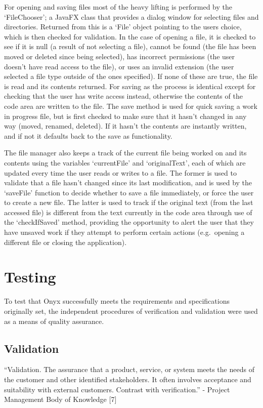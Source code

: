 \documentclass[
]{report}
\begin{document}
For opening and saving files most of the heavy lifting is performed by
the `FileChooser'; a JavaFX class that provides a dialog window for
selecting files and directories. Returned from this is a `File' object
pointing to the users choice, which is then checked for validation. In
the case of opening a file, it is checked to see if it is null (a result
of not selecting a file), cannot be found (the file has been moved or
deleted since being selected), has incorrect permissions (the user
doesn't have read access to the file), or uses an invalid extension (the
user selected a file type outside of the ones specified). If none of
these are true, the file is read and its contents returned. For saving
as the process is identical except for checking that the user has write
access instead, otherwise the contents of the code area are written to
the file. The save method is used for quick saving a work in progress
file, but is first checked to make sure that it hasn't changed in any
way (moved, renamed, deleted). If it hasn't the contents are instantly
written, and if not it defaults back to the save as functionality.

The file manager also keeps a track of the current file being worked on
and its contents using the variables `currentFile' and `originalText',
each of which are updated every time the user reads or writes to a file.
The former is used to validate that a file hasn't changed since its last
modification, and is used by the `saveFile' function to decide whether
to save a file immediately, or force the user to create a new file. The
latter is used to track if the original text (from the last accessed
file) is different from the text currently in the code area through use
of the `checkIfSaved' method, providing the opportunity to alert the
user that they have unsaved work if they attempt to perform certain
actions (e.g.~opening a different file or closing the application).

\chapter{Testing}
To test that Onyx successfully meets the requirements and specifications
originally set, the independent procedures of verification and
validation were used as a means of quality assurance.

\section{Validation}
``Validation. The assurance that a product, service, or system meets the
needs of the customer and other identified stakeholders. It often
involves acceptance and suitability with external customers. Contrast
with verification.'' - Project Management Body of Knowledge {[}7{]}
\end{document}
